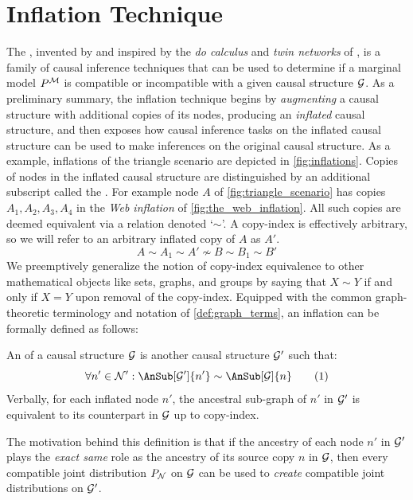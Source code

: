 \documentclass[aps, 10pt, english, twoside, pra, nofootinbib, tightenlines, longbibliography]{revtex4-1}
\begin{document}
    \section{Inflation Technique}
    \label{sec:inflation_technique}
    The , invented by \citet{Inflation} and inspired by the \textit{do calculus} and \textit{twin networks} of \citet{Pearl_2009}, is a family of causal inference techniques that can be used to determine if a marginal model $\prob^{\mscenario}$ is compatible or incompatible with a given causal structure $\mathcal{G}$. As a preliminary summary, the inflation technique begins by \textit{augmenting} a causal structure with additional copies of its nodes, producing an \textit{inflated} causal structure, and then exposes how causal inference tasks on the inflated causal structure can be used to make inferences on the original causal structure. As a example, inflations of the triangle scenario are depicted in \cref{fig:inflations}. Copies of nodes in the inflated causal structure are distinguished by an additional subscript called the . For example node $A$ of \cref{fig:triangle_scenario} has copies $A_1, A_2, A_3, A_4$ in the \textit{Web inflation} of \cref{fig:the_web_inflation}. All such copies are deemed equivalent via a  relation denoted `$\sim$'. A copy-index is effectively arbitrary, so we will refer to an arbitrary inflated copy of $A$ as $A'$.
    \[ A \sim A_1 \sim A' \not\sim B \sim B_1 \sim B' \]
    We preemptively generalize the notion of copy-index equivalence to other mathematical objects like sets, graphs, and groups by saying that $X \sim Y$ if and only if $X = Y$ upon removal of the copy-index. Equipped with the common graph-theoretic terminology and notation of \cref{def:graph_terms}, an inflation can be formally defined as follows:
    \begin{definition}
        An  of a causal structure $\mathcal{G}$ is another causal structure $\mathcal{G}'$ such that:
        \[ \forall n' \in \nodes': \AnSub[\graph']{n'} \sim \AnSub[\graph]{n} \eq \label{eq:inflation_defn}\]
        Verbally, for each inflated node $n'$, the ancestral sub-graph of $n'$ in $\mathcal{G}'$ is equivalent to its counterpart in $\mathcal{G}$ up to copy-index.
    \end{definition}
    The motivation behind this definition is that if the ancestry of each node $n'$ in $\mathcal{G}'$ plays the \textit{exact same} role as the ancestry of its source copy $n$ in $\mathcal{G}$, then every compatible joint distribution $\prob[\nodes]$ on $\mathcal{G}$ can be used to \textit{create} compatible joint distributions on $\mathcal{G}'$.
\end{document}
